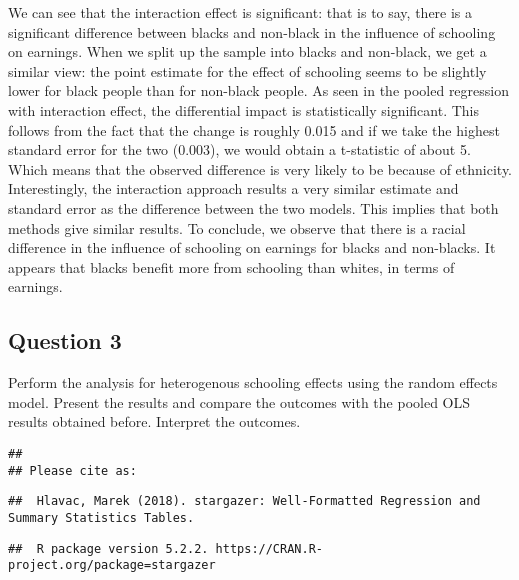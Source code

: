 \documentclass[
]{article}
\begin{document}
We can see that the interaction effect is significant: that is to say,
there is a significant difference between blacks and non-black in the
influence of schooling on earnings. When we split up the sample into
blacks and non-black, we get a similar view: the point estimate for the
effect of schooling seems to be slightly lower for black people than for
non-black people. As seen in the pooled regression with interaction
effect, the differential impact is statistically significant. This
follows from the fact that the change is roughly 0.015 and if we take
the highest standard error for the two (0.003), we would obtain a
t-statistic of about 5. Which means that the observed difference is very
likely to be because of ethnicity. Interestingly, the interaction
approach results a very similar estimate and standard error as the
difference between the two models. This implies that both methods give
similar results. To conclude, we observe that there is a racial
difference in the influence of schooling on earnings for blacks and
non-blacks. It appears that blacks benefit more from schooling than
whites, in terms of earnings.

\clearpage

\hypertarget{question-3}{%
\subsection{Question 3}\label{question-3}}

Perform the analysis for heterogenous schooling effects using the random
effects model. Present the results and compare the outcomes with the
pooled OLS results obtained before. Interpret the outcomes.

\begin{verbatim}
## 
## Please cite as:
\end{verbatim}

\begin{verbatim}
##  Hlavac, Marek (2018). stargazer: Well-Formatted Regression and Summary Statistics Tables.
\end{verbatim}

\begin{verbatim}
##  R package version 5.2.2. https://CRAN.R-project.org/package=stargazer
\end{verbatim}
\end{document}
